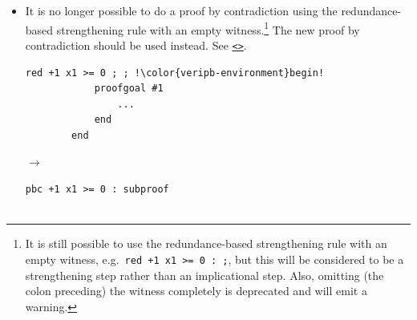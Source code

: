 \documentclass[a4paper]{article}
\newcommand{\lnkBNF}[1]{\hyperlink{def:#1}{<\detokenize{#1}>}}
\newcommand{\veriPB}[0]{\textsc{VeriPB}}
\begin{document}
\begin{itemize}
\begin{minipage}{.47\linewidth}
		      \begin{lstlisting}[language=veripb, gobble=8, rulecolor=\color{veripb-invalid-text}, caption={\veriPB{} 2.0 syntax.}]
		red +1 ~r1 +1 x1 >= 1 ; r1 -> 0 ; !\color{veripb-environment}begin!
			proofgoal #1
				...
			end
		end
		\end{lstlisting}
	      \end{minipage}\hfill%
	      \begin{minipage}[t]{.05\linewidth}
		      \centering \vspace*{-5mm}$\to$
	      \end{minipage}\hfill%
	      \hfill%
	      \begin{minipage}{.47\linewidth}
		      \begin{lstlisting}[language=veripb, gobble=8, rulecolor=\color{veripb-valid-text}, caption={\veriPB{} 3.0 syntax.}]
		red +1 ~r1 +1 x1 >= 1 : r1 -> 0 : subproof
			proofgoal #1
				...
			qed;
		qed;
		\end{lstlisting}
	      \end{minipage}
	\item It is no longer possible to do a proof by contradiction using the redundance-based strengthening rule with an empty witness.\footnote{It is still possible to use the redundance-based strengthening rule with an empty witness, e.g.\ \lstinline[language=veripb]!red +1 x1 >= 0 : ;!, but this will be considered to be a strengthening step rather than an implicational step. Also, omitting (the colon preceding) the witness completely is deprecated and will emit a warning.} The new proof by contradiction should be used instead. See \texttt{\lnkBNF{pbc_rule}}.
	      \\[1mm]
	      \begin{minipage}{.47\linewidth}
		      \begin{lstlisting}[language=veripb, gobble=8, rulecolor=\color{veripb-invalid-text}, caption={\veriPB{} 2.0 syntax.}]
		red +1 x1 >= 0 ; ; !\color{veripb-environment}begin!
			proofgoal #1
				...
			end
		end
		\end{lstlisting}
	      \end{minipage}\hfill%
	      \begin{minipage}[t]{.05\linewidth}
		      \centering \vspace*{-5mm}$\to$
	      \end{minipage}\hfill%
	      \hfill%
	      \begin{minipage}{.47\linewidth}
		      \begin{lstlisting}[language=veripb, gobble=8, rulecolor=\color{veripb-valid-text}, caption={\veriPB{} 3.0 syntax.}]
		pbc +1 x1 >= 0 : subproof


\end{lstlisting}
\end{minipage}
\end{itemize}
\end{document}
